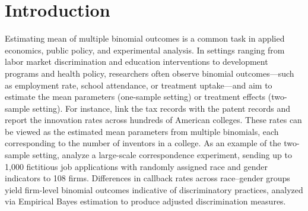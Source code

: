 \documentclass[12pt,letterpaper]{article}
\begin{document}
\newpage
\onehalfspacing

\section{Introduction}
Estimating mean of multiple binomial outcomes is a common task in applied economics, public policy, and experimental analysis. In settings ranging from labor market discrimination and education interventions to development programs and health policy, researchers often observe binomial outcomes—such as employment rate, school attendance, or treatment uptake—and aim to estimate the mean parameters (one-sample setting) or treatment effects (two-sample setting). For instance, \cite{bell2019becomes} link the tax records with the patent records and report the innovation rates across hundreds of American colleges. These rates can be viewed as the estimated mean parameters from multiple binomials, each corresponding to the number of inventors in a college. As an example of the two-sample setting, \citet{kline2024discrimination} analyze a large-scale correspondence experiment, sending up to 1,000 fictitious job applications with randomly assigned race and gender indicators to 108 firms. Differences in callback rates across race–gender groups yield firm-level binomial outcomes indicative of discriminatory practices, analyzed via Empirical Bayes estimation to produce adjusted discrimination measures. 

\end{document}
